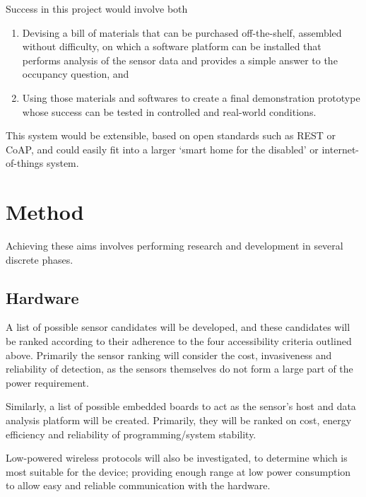 \documentclass[12pt, a4paper]{article}
\begin{document}
Success in this project would involve both
\begin{enumerate}
 \item Devising a bill of materials that can be purchased off-the-shelf, assembled without difficulty, on which a software platform can be installed that performs analysis of the sensor data and provides a simple answer to the occupancy question, and
 \item Using those materials and softwares to create a final demonstration prototype whose success can be tested in controlled and real-world conditions.
\end{enumerate}

This system would be extensible, based on open standards such as REST or CoAP, \cite{guinard2012search}\cite{kovatsch2013coap} and could easily fit into a larger `smart home for the disabled' or internet-of-things system.

 
\section*{Method}

Achieving these aims involves performing research and development in several discrete phases.

\subsection*{Hardware}
A list of possible sensor candidates will be developed, and these candidates will be ranked according to their adherence to the four accessibility criteria outlined above. Primarily the sensor ranking will consider the cost, invasiveness and reliability of detection, as the sensors themselves do not form a large part of the power requirement.

Similarly, a list of possible embedded boards to act as the sensor's host and data analysis platform will be created. Primarily, they will be ranked on cost, energy efficiency and reliability of programming/system stability.

Low-powered wireless protocols will also be investigated, to determine which is most suitable for the device; providing enough range at low power consumption to allow easy and reliable communication with the hardware.
\end{document}

